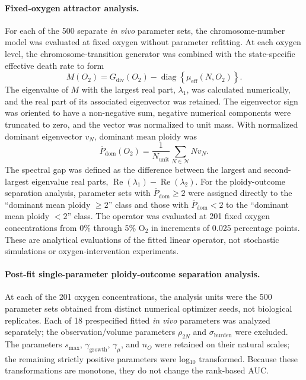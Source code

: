 \documentclass[11pt]{article}
\begin{document}
\paragraph{Fixed-oxygen attractor analysis.}
For each of the 500 separate \textit{in vivo} parameter sets, the chromosome-number model was evaluated at fixed oxygen without parameter refitting. At each oxygen level, the chromosome-transition generator was combined with the state-specific effective death rate to form
\begin{equation}
M(O_2)=G_{\mathrm{div}}(O_2)-\operatorname{diag}\!\left\{\mu_{\mathrm{eff}}(N,O_2)\right\}.
\label{eq:appendix_fixed_o2_operator}
\end{equation}
The eigenvalue of $M$ with the largest real part, $\lambda_1$, was calculated numerically, and the real part of its associated eigenvector was retained. The eigenvector sign was oriented to have a non-negative sum, negative numerical components were truncated to zero, and the vector was normalized to unit mass. With normalized dominant eigenvector $v_N$, dominant mean ploidy was
\begin{equation}
\overline P_{\mathrm{dom}}(O_2)=\frac{1}{N_{\mathrm{unit}}}\sum_{N\in\mathcal N}Nv_N.
\label{eq:appendix_fixed_o2_mean_ploidy}
\end{equation}
The spectral gap was defined as the difference between the largest and second-largest eigenvalue real parts, $\operatorname{Re}(\lambda_1)-\operatorname{Re}(\lambda_2)$. For the ploidy-outcome separation analysis, parameter sets with $\overline P_{\mathrm{dom}}\geq2$ were assigned directly to the ``dominant mean ploidy $\geq2$'' class and those with $\overline P_{\mathrm{dom}}<2$ to the ``dominant mean ploidy $<2$'' class. The operator was evaluated at 201 fixed oxygen concentrations from 0\% through 5\% O$_2$ in increments of 0.025 percentage points. These are analytical evaluations of the fitted linear operator, not stochastic simulations or oxygen-intervention experiments.

\paragraph{Post-fit single-parameter ploidy-outcome separation analysis.}
At each of the 201 oxygen concentrations, the analysis units were the 500 parameter sets obtained from distinct numerical optimizer seeds, not biological replicates. Each of 18 prespecified fitted \textit{in vivo} parameters was analyzed separately; the observation/volume parameters $\rho_{2N}$ and $\sigma_{\mathrm{burden}}$ were excluded. The parameters $s_{\max}$, $\gamma_{\mathrm{growth}}$, $\gamma_\mu$, and $n_O$ were retained on their natural scales; the remaining strictly positive parameters were log$_{10}$ transformed. Because these transformations are monotone, they do not change the rank-based AUC.
\end{document}
